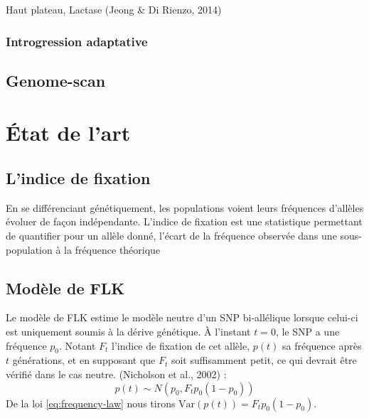 \documentclass[12pt,twoside]{ugathesis}
\begin{document}
  Haut plateau, Lactase (Jeong \& Di Rienzo, 2014)
  
  \subsection{Introgression adaptative}\label{introgression-adaptative}
  
  \section{Genome-scan}\label{genome-scan}
  
  \chapter{État de l'art}\label{etat-de-lart}
  
  \section{L'indice de fixation}\label{lindice-de-fixation}
  
  En se différenciant génétiquement, les populations voient leurs
  fréquences d'allèles évoluer de façon indépendante. L'indice de fixation
  est une statistique permettant de quantifier pour un allèle donné,
  l'écart de la fréquence observée dans une sous-population à la fréquence
  théorique
  
  \section{Modèle de FLK}\label{modele-de-flk}
  
  Le modèle de FLK estime le modèle neutre d'un SNP bi-allélique lorsque
  celui-ci est uniquement soumis à la dérive génétique. À l'instant
  \(t = 0\), le SNP a une fréquence \(p_0\). Notant \(F_t\) l'indice de
  fixation de cet allèle, \(p(t)\) sa fréquence après \(t\) générations,
  et en supposant que \(F_t\) soit suffisamment petit, ce qui devrait être
  vérifié dans le cas neutre. (Nicholson et al., 2002) :
  \begin{equation} 
    p(t) \sim N(p_0, F_t p_0 (1-p_0)) 
    \label{eq:frequency-law}
  \end{equation}
  De la loi \eqref{eq:frequency-law} nous tirons
  \(\text{Var}(p(t)) = F_t p_0 (1-p_0)\).
  
\end{document}
